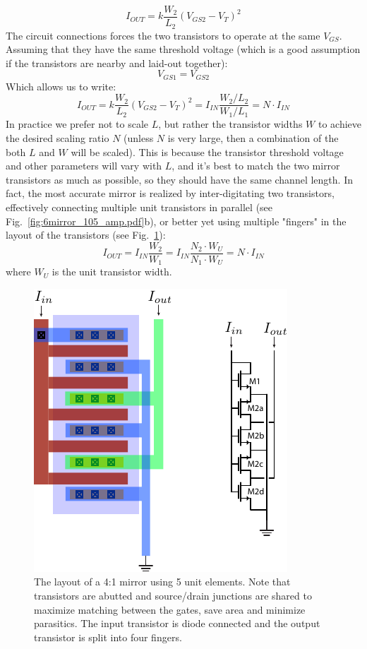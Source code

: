     \begin{equation}
        {I_{OUT}} = k\frac{{{W_2}}}{{{L_2}}}{({V_{GS2}} - {V_T})^2}
    \end{equation}
The circuit connections forces the two transistors to operate at the same $V_{GS}$.  Assuming that they have the same threshold voltage (which is a good assumption if the transistors are nearby and laid-out together):
    \begin{equation}
        {V_{GS1}} = {V_{GS2}}
    \end{equation}
Which allows us to write:
    \begin{equation}
        {I_{OUT}} = k\frac{{{W_2}}}{{{L_2}}}{({V_{GS2}} - {V_T})^2} = {I_{IN}}\frac{{{W_2}/{L_2}}}{{{W_1}/{L_1}}} = N \cdot {I_{IN}}
    \end{equation}
In practice we prefer not to scale $L$, but rather the transistor widths $W$ to achieve the desired scaling ratio $N$ (unless $N$ is very large, then a combination of the both $L$ and $W$ will be scaled).  This is because the transistor threshold voltage and other parameters will vary with $L$, and it's best to match the two mirror transistors as much as possible, so they should have the same channel length.  In fact, the most accurate mirror is realized by inter-digitating two transistors, effectively connecting multiple unit transistors in parallel (see Fig.~\ref{fig:6mirror_105_amp.pdf}b), or better yet using multiple "fingers" in the layout of the transistors (see Fig.~\ref{fig:mirror_layout}):
    \begin{equation}
        {I_{OUT}} =  {I_{IN}}\frac{W_2}{W_1} = {I_{IN}}\frac{N_2\cdot W_U}{N_1\cdot W_U} = N \cdot {I_{IN}}
    \end{equation}
where $W_U$ is the unit transistor width.  
\begin{figure}[tb]
\centering
\includegraphics[width=.55\columnwidth]{mirror_layout.pdf} 
\caption{The layout of a 4:1 mirror using 5 unit elements. Note that transistors are abutted and source/drain junctions are shared to maximize matching between the gates, save area and minimize parasitics.  The input transistor is diode connected and the output transistor is split into four fingers.}
\label{fig:mirror_layout}
\end{figure}
